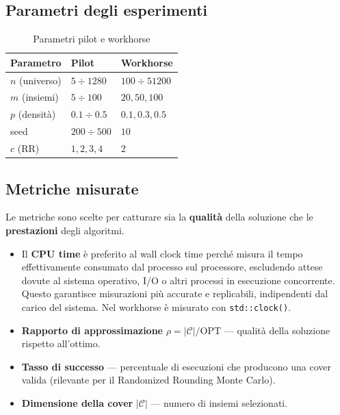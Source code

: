 \documentclass[12pt, a4paper]{article}
\begin{document}
\subsection*{Parametri degli esperimenti}

\begin{table}[H]
\centering
\caption{Parametri pilot e workhorse}
\label{tab:params}
\begin{tabular}{lll}
\toprule
Parametro & Pilot & Workhorse \\
\midrule
$n$ (universo) & $5 \div 1280$ & $100 \div 51200$ \\
$m$ (insiemi)  & $5 \div 100$  & $20, 50, 100$ \\
$p$ (densit\`a) & $0.1 \div 0.5$ & $0.1, 0.3, 0.5$ \\
seed           & $200 \div 500$ & $10$ \\
$c$ (RR)       & $1, 2, 3, 4$  & $2$ \\
\bottomrule
\end{tabular}
\end{table}

\subsection*{Metriche misurate}

Le metriche sono scelte per catturare sia la \textbf{qualit\`a} 
della soluzione che le \textbf{prestazioni} degli algoritmi.

\begin{itemize}

     \item Il \textbf{CPU time} \`e preferito al wall clock time perch\'e 
    misura il tempo effettivamente consumato dal processo sul processore, 
    escludendo attese dovute al sistema operativo, I/O o altri processi 
    in esecuzione concorrente. Questo garantisce misurazioni pi\`u 
    accurate e replicabili, indipendenti dal carico del sistema.
    Nel workhorse \`e misurato con \texttt{std::clock()}.

    \item \textbf{Rapporto di approssimazione} $\rho = |\mathcal{C}| / \mathrm{OPT}$
    — qualit\`a della soluzione rispetto all'ottimo.

    \item \textbf{Tasso di successo} — percentuale di esecuzioni che producono
    una cover valida (rilevante per il Randomized Rounding Monte Carlo).

    \item \textbf{Dimensione della cover} $|\mathcal{C}|$ — numero di insiemi
    selezionati.
\end{itemize}
\end{document}
